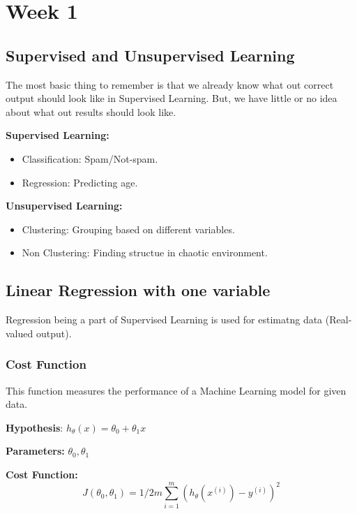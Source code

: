 \documentclass[12pt]{report}
\begin{document}
\tableofcontents

\chapter{Week 1}

\section{Supervised and Unsupervised Learning}
  The most basic thing to remember is that we already know what out correct output should look like in Supervised Learning.
  But, we have little or no idea about what out results should look like.

  \textbf{Supervised Learning:}
  \begin{itemize}
  	\item Classification: Spam/Not-spam. 
  	\item Regression: Predicting age.
  \end{itemize}

  \textbf{Unsupervised Learning:}
  \begin{itemize}
  	\item Clustering: Grouping based on different variables.
  	\item Non Clustering: Finding structue in chaotic environment.
  \end{itemize}

\section{Linear Regression with one variable}
  Regression being a part of Supervised Learning is used for estimatng data (Real-valued output).  

  \subsection{Cost Function}
    This function measures the performance of a Machine Learning model for given data.

    \textbf{Hypothesis}: $ h_ \theta(x) = \theta_0 + \theta_1x $

    \textbf{Parameters:} $ \theta_0, \theta_1 $

    \textbf{Cost Function:} 
    \begin{equation} \label {eq:1}
    	J( \theta_0, \theta_1 ) = 1/2m \sum_{i=1}^{m} (h_\theta(x^{(i)})-y^{(i)})^2 
    \end{equation} 
\end{document}
